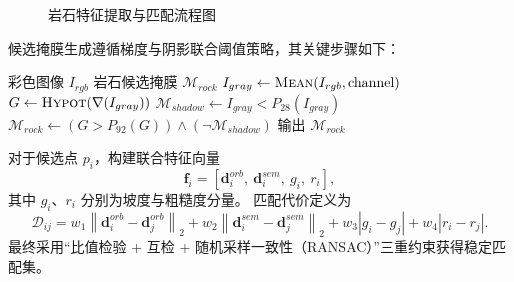 \documentclass[UTF8,zihao=-4,a4paper,oneside,openany]{ctexrep}
\numberwithin{equation}{chapter}
\theoremstyle{plain}
\theoremstyle{definition}
\newcommand{\norm}[1]{\left\| #1 \right\|}
\newcommand{\abs}[1]{\left| #1 \right|}
\begin{document}
\begin{figure}[H]
	\centering
	\caption{岩石特征提取与匹配流程图}
	\label{fig:ch5_feature_matching_flow}
\end{figure}

候选掩膜生成遵循梯度与阴影联合阈值策略，其关键步骤如下：
\begin{algorithm}[H]
\caption{岩石候选区域提取关键伪代码}
\label{lst:ch5_rock_mask_code}
\begin{algorithmic}[1]
\REQUIRE 彩色图像 $I_{rgb}$
\ENSURE 岩石候选掩膜 $\mathcal{M}_{rock}$
\STATE $I_{gray} \leftarrow \textsc{Mean}(I_{rgb},\text{channel})$
\STATE $G \leftarrow \textsc{Hypot}(\nabla(I_{gray}))$
\STATE $\mathcal{M}_{shadow} \leftarrow I_{gray} < P_{28}(I_{gray})$
\STATE $\mathcal{M}_{rock} \leftarrow (G > P_{92}(G)) \land (\neg \mathcal{M}_{shadow})$
\STATE 输出 $\mathcal{M}_{rock}$
\end{algorithmic}
\end{algorithm}

对于候选点 $p_i$，构建联合特征向量
\begin{equation}
\mathbf{f}_i=[\mathbf{d}^{orb}_i,\ \mathbf{d}^{sem}_i,\ g_i,\ r_i],
\label{eq:ch5_joint_feature}
\end{equation}
其中 $g_i$、$r_i$ 分别为坡度与粗糙度分量。
匹配代价定义为
\begin{equation}
\mathcal{D}_{ij}=w_1\norm{\mathbf{d}^{orb}_i-\mathbf{d}^{orb}_j}_2
+w_2\norm{\mathbf{d}^{sem}_i-\mathbf{d}^{sem}_j}_2
+w_3\abs{g_i-g_j}+w_4\abs{r_i-r_j}.
\label{eq:ch5_match_distance}
\end{equation}
最终采用“比值检验 + 互检 + 随机采样一致性（RANSAC）”三重约束获得稳定匹配集。
\end{document}
